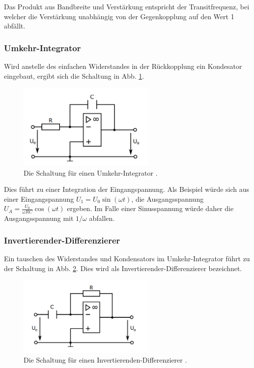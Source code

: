    Das Produkt aus Bandbreite und Verstärkung entspricht der Transitfrequenz, bei welcher die Verstärkung unabhängig von der Gegenkopplung auf den Wert 1 abfällt.

    \subsubsection{Umkehr-Integrator}

    Wird anstelle des einfachen Widerstandes in der Rückkopplung ein Kondesator eingebaut, ergibt sich die Schaltung in Abb. \ref{fig:integrator}.

    \begin{figure}
    \centering
    \includegraphics[width=0.6\textwidth]{Pics/integrator.png}
    \caption{Die Schaltung für einen Umkehr-Integrator \cite{anleitungneu}.}
    \label{fig:integrator}
    \end{figure}

    Dies führt zu einer Integration der Eingangspannung. Als Beispiel würde sich aus einer Eingangspannung $U_1 = U_0\sin(\omega t)$, die Ausgangsspannung
    $U_A = \frac{U_0}{\omega RC}\cos(\omega t)$ ergeben.
    Im Falle einer Sinusspannung würde daher die Ausgangsspannung mit $1/\omega$ abfallen.

    \subsubsection{Invertierender-Differenzierer}

    Ein tauschen des Widerstandes und Kondensators im Umkehr-Integrator führt zu der Schaltung in Abb. \ref{fig:diffdiff}. Dies wird als Invertierender-Differenzierer bezeichnet.

    \begin{figure}
    \centering
    \includegraphics[width=0.6\textwidth]{Pics/diff.png}
    \caption{Die Schaltung für einen Invertierenden-Differenzierer \cite{anleitungneu}.}
    \label{fig:diffdiff}
    \end{figure}

